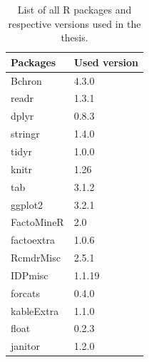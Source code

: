 \documentclass[12pt,twoside]{reedthesis}
\begin{document}
\begin{table}

\caption{\label{tab:unnamed-chunk-53}List of all R packages and respective versions used in the thesis.}
\centering
\begin{tabular}[t]{ll}
\toprule
Packages & Used version\\
\midrule
Bchron & 4.3.0\\
readr & 1.3.1\\
dplyr & 0.8.3\\
stringr & 1.4.0\\
tidyr & 1.0.0\\
\addlinespace
knitr & 1.26\\
tab & 3.1.2\\
ggplot2 & 3.2.1\\
FactoMineR & 2.0\\
factoextra & 1.0.6\\
\addlinespace
RcmdrMisc & 2.5.1\\
IDPmisc & 1.1.19\\
forcats & 0.4.0\\
kableExtra & 1.1.0\\
float & 0.2.3\\
\addlinespace
janitor & 1.2.0\\
\bottomrule
\end{tabular}
\end{table}
\end{document}
